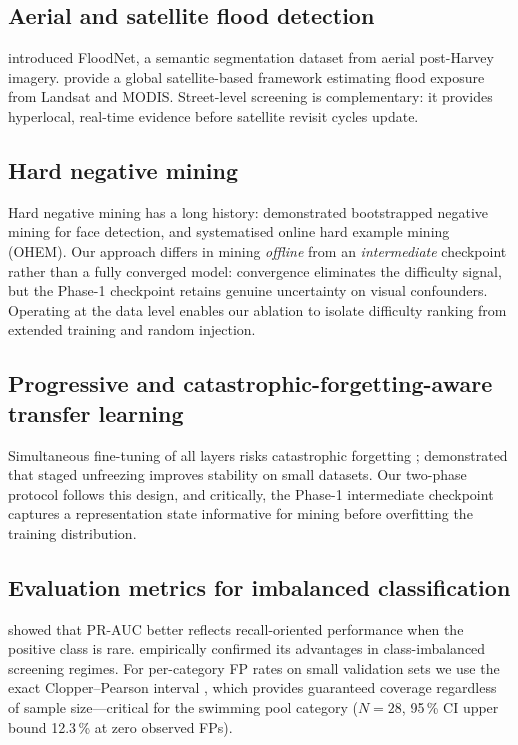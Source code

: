 \documentclass[a4paper,fleqn]{cas-sc}
\newcommand{\CP}{Clopper--Pearson\xspace}
\begin{document}
\subsection{Aerial and satellite flood detection}
\label{sec:related:aerial}

\citet{Rahnemoonfar2020} introduced FloodNet, a semantic segmentation dataset from aerial post-Harvey imagery.
\citet{Tellman2021} provide a global satellite-based framework estimating flood exposure from Landsat and MODIS.
Street-level screening is complementary: it provides hyperlocal, real-time evidence before satellite revisit cycles update.

\subsection{Hard negative mining}
\label{sec:related:hnm}

Hard negative mining has a long history: \citet{Viola2004} demonstrated bootstrapped negative mining for face detection,
and \citet{Shrivastava2016} systematised online hard example mining (OHEM).
Our approach differs in mining \emph{offline} from an \emph{intermediate} checkpoint rather than a fully converged model:
convergence eliminates the difficulty signal, but the Phase-1 checkpoint retains genuine uncertainty on visual confounders.
Operating at the data level enables our ablation to isolate difficulty ranking from extended training and random injection.

\subsection{Progressive and catastrophic-forgetting-aware transfer learning}
\label{sec:related:progressive}

Simultaneous fine-tuning of all layers risks catastrophic forgetting \citep{Kirkpatrick2017};
\citet{Lyu2025} demonstrated that staged unfreezing improves stability on small datasets.
Our two-phase protocol follows this design, and critically, the Phase-1 intermediate checkpoint
captures a representation state informative for mining before overfitting the training distribution.

\subsection{Evaluation metrics for imbalanced classification}
\label{sec:related:metrics}

\citet{Davis2006} showed that PR-AUC better reflects recall-oriented performance when the positive class is rare.
\citet{Saito2015} empirically confirmed its advantages in class-imbalanced screening regimes.
For per-category FP rates on small validation sets we use the exact \CP{} interval \citep{Clopper1934},
which provides guaranteed coverage regardless of sample size---critical for the swimming pool
category ($N{=}28$, 95\,\% CI upper bound 12.3\,\% at zero observed FPs).
\end{document}
